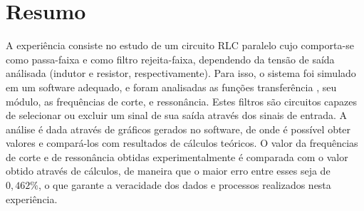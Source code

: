 \newpage

\section{Resumo}

A experiência consiste no estudo de um circuito RLC paralelo cujo comporta-se como passa-faixa e
como filtro rejeita-faixa, dependendo da tensão de saída análisada (indutor e resistor, respectivamente). Para isso, o sistema foi simulado em um software adequado, e foram analisadas as funções transferência , seu módulo, as frequências de corte, e ressonância. Estes filtros são circuitos capazes de selecionar ou excluir um sinal de sua saída
através dos sinais de entrada. A análise é dada através de gráficos gerados no software, de onde é
possível obter valores e compará-los com resultados de cálculos teóricos. O valor da frequências de corte e de ressonância obtidas
experimentalmente é comparada com o valor obtido através de cálculos, de maneira que o maior erro entre esses seja de
$0,462\%$, o que garante a veracidade dos dados e processos realizados nesta experiência.

\pagebreak